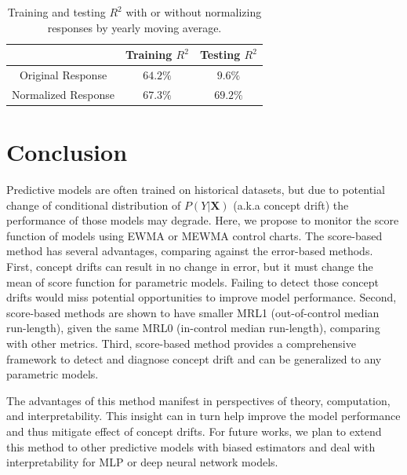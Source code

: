\documentclass[twoside,11pt]{article}
\begin{document}
\begin{table}[!htbp]
\centering
\begin{tabular}{|c|c|c|} \hline
 & Training $R^2$ & Testing $R^2$ \\ \hline
 Original Response & $64.2\%$ & $9.6\%$ \\ \hline 
 Normalized Response & $\bm{67.3}\%$ & $\bm{69.2}\%$ \\ \hline
\end{tabular}
\caption{Training and testing $R^2$ with or without normalizing responses by yearly moving average.}
\label{table:fit_pred_preproc}
\end{table}

\section{Conclusion}
Predictive models are often trained on historical datasets, but due to potential change of conditional distribution of $P (Y|\bm {X})$ (a.k.a concept drift) the performance of those models may degrade. Here, we propose to monitor the score function of models using EWMA or MEWMA control charts. The score-based method has several advantages, comparing against the error-based methods. First, concept drifts can result in no change in error, but it must change the mean of score function for parametric models. Failing to detect those concept drifts would miss potential opportunities to improve model performance. Second, score-based methods are shown to have smaller MRL1 (out-of-control median run-length), given the same MRL0 (in-control median run-length), comparing with other metrics. Third, score-based method provides a comprehensive framework to detect and diagnose concept drift and can be generalized to any parametric models. 

The advantages of this method manifest in perspectives of theory, computation, and interpretability. This insight can in turn help improve the model performance and thus mitigate effect of concept drifts. For future works, we plan to extend this method to other predictive models with biased estimators and deal with interpretability for MLP or deep neural network models.

\end{document}

